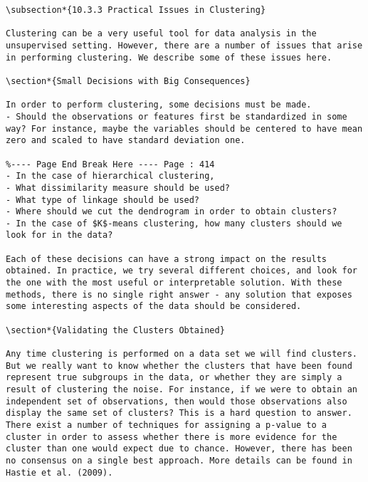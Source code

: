 \documentclass[10pt]{article}
\begin{document}
\begin{verbatim}
\subsection*{10.3.3 Practical Issues in Clustering}

Clustering can be a very useful tool for data analysis in the unsupervised setting. However, there are a number of issues that arise in performing clustering. We describe some of these issues here.

\section*{Small Decisions with Big Consequences}

In order to perform clustering, some decisions must be made.
- Should the observations or features first be standardized in some way? For instance, maybe the variables should be centered to have mean zero and scaled to have standard deviation one.

%---- Page End Break Here ---- Page : 414
- In the case of hierarchical clustering,
- What dissimilarity measure should be used?
- What type of linkage should be used?
- Where should we cut the dendrogram in order to obtain clusters?
- In the case of $K$-means clustering, how many clusters should we look for in the data?

Each of these decisions can have a strong impact on the results obtained. In practice, we try several different choices, and look for the one with the most useful or interpretable solution. With these methods, there is no single right answer - any solution that exposes some interesting aspects of the data should be considered.

\section*{Validating the Clusters Obtained}

Any time clustering is performed on a data set we will find clusters. But we really want to know whether the clusters that have been found represent true subgroups in the data, or whether they are simply a result of clustering the noise. For instance, if we were to obtain an independent set of observations, then would those observations also display the same set of clusters? This is a hard question to answer. There exist a number of techniques for assigning a p-value to a cluster in order to assess whether there is more evidence for the cluster than one would expect due to chance. However, there has been no consensus on a single best approach. More details can be found in Hastie et al. (2009).


\end{verbatim}
\end{document}
